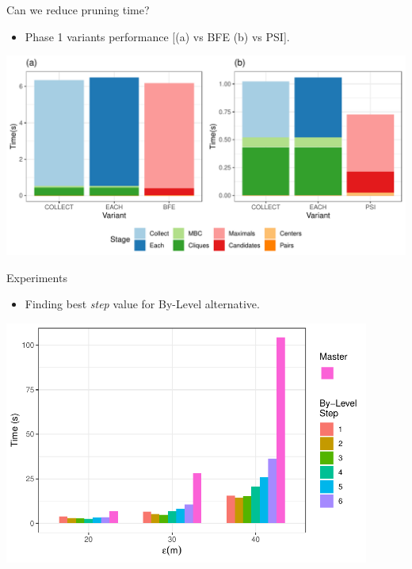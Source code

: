\begin{frame}{Can we reduce pruning time?}
    \begin{itemize}
        \item Phase 1 variants performance [(a) vs BFE (b) vs PSI].
    \end{itemize} \vspace{0.25cm}

    \centering
    \includegraphics[width=\textwidth]
            {../thesis/chapterPFlocks/figures/plots/10_cmbc_variants/cmbc}
\end{frame}

% 

\begin{frame}{Experiments}
    \begin{itemize}
        \item Finding best \textit{step} value for By-Level alternative.
    \end{itemize} \vspace{0.25cm}

    \centering
    \includegraphics[width=0.9\textwidth]
            {../thesis/chapterPFlocks/figures/plots/06_step_performance/step_performance}
\end{frame}

